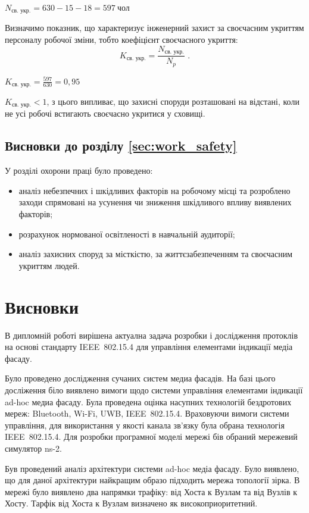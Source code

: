 \documentclass[a4paper,ukrainian,utf8,nocolumnsxix,floatsection,equationsection]{eskdtext}
\newcommand{\sectionnonum}[1]{\section*{#1}\addcontentsline{toc}{section}{#1}}
\newcommand{\iee}[0]{IEEE~802.15.4\xspace}
\begin{document}
$N_\text{св. укр.} = 630 - 15 - 18 = 597 \:\text{чол}$

Визначимо показник, що характеризує інженерний захист за своєчасним укриттям персоналу робочої зміни, тобто коефіцієнт своєчасного укриття:
\begin{equation}
	K_\text{св. укр.} = \frac{N_\text{св. укр.}}{N_p} \text{ .}
\end{equation}

$K_\text{св. укр.} = \frac{597}{630} = 0,95$

$K_\text{св. укр.} < 1$, з цього випливає, що захисні споруди розташовані на відстані, коли не усі робочі встигають своєчасно укритися у сховищі.

\subsection{Висновки до розділу \ref{sec:work_safety}}

У розділі охорони праці було проведено:

\begin{itemize}
	\item аналіз небезпечних і шкідливих факторів на робочому місці та розроблено заходи спрямовані на усунення чи зниження шкідливого впливу виявлених факторів;
	\item розрахунок нормованої освітленості в навчальній аудиторії;
	\item аналіз захисних споруд за місткістю, за життєзабезпеченням та своєчасним укриттям людей. 
\end{itemize}



\sectionnonum{Висновки}

В дипломній роботі вирішена актуална задача розробки і дослідження протоклів на основі стандарту \iee для управління елементами індикації медіа фасаду.

Було проведено дослідження сучаних систем медиа фасадів. На базі цього досліження біло виявлено вимоги щодо системи управління елементами індикації ad-hoc медиа фасаду. Була проведена оцінка насупних технологій бездротових мереж: Bluetooth, Wi-Fi, UWB, \iee. Враховуючи вимоги системи управління, для використання у якості канала зв’язку була обрана технологія \iee. Для розробки програмної моделі мережі бів обраний мережевий симулятор ns-2.

Був проведений аналіз архітектури системи ad-hoc медіа фасаду. Було виявлено, що для даної архітектури найкращим образо підходить мережа топології зірка. В мережі було виявлено два напрямки трафіку: від Хоста к Вузлам та від Вузлів к Хосту. Тарфік від Хоста к Вузлам визначено як високоприоритетний.
\end{document}
